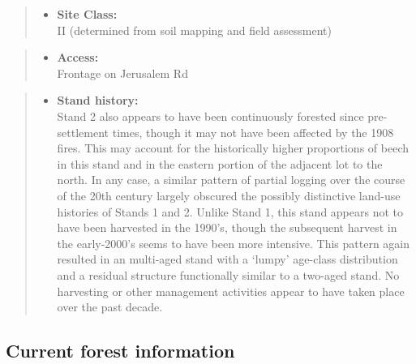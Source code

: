 \documentclass[]{tufte-handout}
\providecommand{\tightlist}{%
  \setlength{\itemsep}{0pt}\setlength{\parskip}{0pt}}
\begin{document}
\begin{quote}
\begin{itemize}
\tightlist
\item
  \textbf{Site Class:}\\
  \vspace{2pt} II (determined from soil mapping and field assessment)
\end{itemize}
\end{quote}

\begin{quote}
\begin{itemize}
\tightlist
\item
  \textbf{Access:}\\
  \vspace{2pt} Frontage on Jerusalem Rd
\end{itemize}
\end{quote}

\begin{quote}
\begin{itemize}
\tightlist
\item
  \textbf{Stand history:}\\
  \vspace{2pt} Stand 2 also appears to have been continuously forested
  since pre-settlement times, though it may not have been affected by
  the 1908 fires. This may account for the historically higher
  proportions of beech in this stand and in the eastern portion of the
  adjacent lot to the north. In any case, a similar pattern of partial
  logging over the course of the 20th century largely obscured the
  possibly distinctive land-use histories of Stands 1 and 2. Unlike
  Stand 1, this stand appears not to have been harvested in the 1990's,
  though the subsequent harvest in the early-2000's seems to have been
  more intensive. This pattern again resulted in an multi-aged stand
  with a `lumpy' age-class distribution and a residual structure
  functionally similar to a two-aged stand. No harvesting or other
  management activities appear to have taken place over the past decade.
\end{itemize}
\end{quote}

\subsection{Current forest
information}\label{current-forest-information-1}
\end{document}
